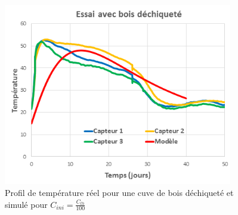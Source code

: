 \documentclass[../PS6_RapportFinal.tex]{subfiles}
\begin{document}
\begin{figure}[!h]
\begin{center}
\includegraphics[width=10cm]{2_4_Essai_septembre.png}
\caption{Profil de température réel pour une cuve de bois déchiqueté et simulé pour $C_{ini} = \frac{C_{th}}{100}$}
\label{concentration_un_centieme}
\end{center}
\end{figure}
\end{document}

